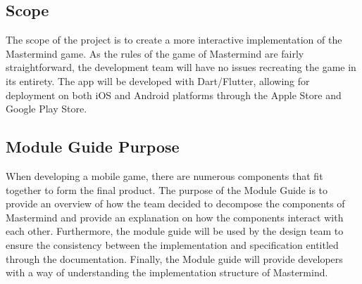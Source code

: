 \documentclass[12pt, titlepage]{article}
\begin{document}
\subsection{Scope}
The scope of the project is to create a more interactive implementation of the Mastermind game. As the rules of the game of Mastermind are fairly straightforward, the development team will have no issues recreating the game in its entirety. The app will be developed with Dart/Flutter, allowing for deployment on both iOS and Android platforms through the Apple Store and Google Play Store.

\subsection{Module Guide Purpose}
When developing a mobile game, there are numerous components that fit together to form the final product. The purpose of the Module Guide is to provide an overview of how the team decided to decompose the components of Mastermind and provide an explanation on how the components interact with each other. Furthermore, the module guide will be used by the design team to ensure the consistency between the implementation and specification entitled through the documentation. Finally, the Module guide will provide developers with a way of understanding the implementation structure of Mastermind. 



\end{document}
